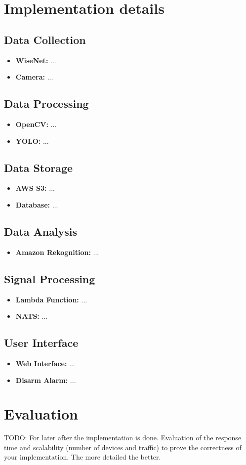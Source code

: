 \documentclass[conference]{IEEEtran}
\begin{document}
\section{Implementation details}
\subsection{Data Collection}
\begin{itemize}
    \item \textbf{WiseNet:} ...
    \item \textbf{Camera:} ...
\end{itemize}
\subsection{Data Processing}
\begin{itemize}
    \item \textbf{OpenCV:} ...
    \item \textbf{YOLO:} ...
\end{itemize}
\subsection{Data Storage}
\begin{itemize}
    \item \textbf{AWS S3:} ...
    \item \textbf{Database:} ...
\end{itemize}
\subsection{Data Analysis}
\begin{itemize}
    \item \textbf{Amazon Rekognition:} ...
\end{itemize}
\subsection{Signal Processing}  
\begin{itemize}
    \item \textbf{Lambda Function:} ...
    \item \textbf{NATS:} ...
\end{itemize}
\subsection{User Interface}
\begin{itemize}
    \item \textbf{Web Interface:} ...
    \item \textbf{Disarm Alarm:} ...
\end{itemize}

\section{Evaluation}
TODO: For later after the implementation is done.
Evaluation of the response time and scalability (number of devices and traffic) to prove the correctness of your implementation. The more detailed the better. 
\end{document}
